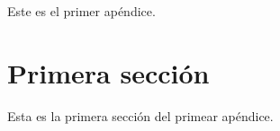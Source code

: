 
Este es el primer ap\'{e}ndice.

\section{Primera secci\'{o}n}

Esta es la primera secci\'{o}n del primear ap\'{e}ndice.
